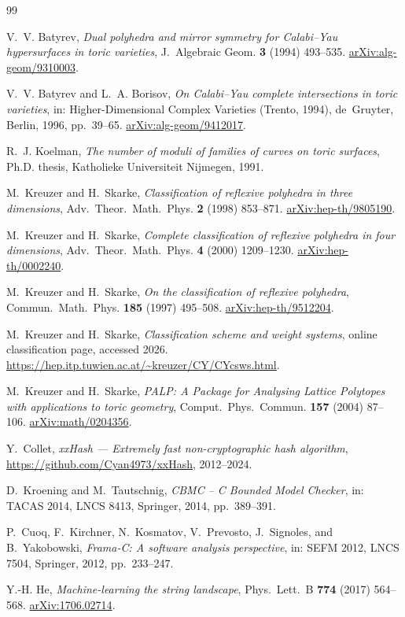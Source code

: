\documentclass[12pt,a4paper]{article}
\theoremstyle{definition}
\begin{document}

\begin{thebibliography}{99}

V.~V. Batyrev,
\emph{Dual polyhedra and mirror symmetry for Calabi--Yau hypersurfaces
in toric varieties},
J.~Algebraic Geom. \textbf{3} (1994) 493--535.
\href{https://arxiv.org/abs/alg-geom/9310003}{arXiv:alg-geom/9310003}.

V.~V. Batyrev and L.~A. Borisov,
\emph{On Calabi--Yau complete intersections in toric varieties},
in: Higher-Dimensional Complex Varieties (Trento, 1994), de~Gruyter,
Berlin, 1996, pp.~39--65.
\href{https://arxiv.org/abs/alg-geom/9412017}{arXiv:alg-geom/9412017}.

R.~J. Koelman,
\emph{The number of moduli of families of curves on toric surfaces},
Ph.D. thesis, Katholieke Universiteit Nijmegen, 1991.

M.~Kreuzer and H.~Skarke,
\emph{Classification of reflexive polyhedra in three dimensions},
Adv.~Theor.~Math.~Phys. \textbf{2} (1998) 853--871.
\href{https://arxiv.org/abs/hep-th/9805190}{arXiv:hep-th/9805190}.

M.~Kreuzer and H.~Skarke,
\emph{Complete classification of reflexive polyhedra in four dimensions},
Adv.~Theor.~Math.~Phys. \textbf{4} (2000) 1209--1230.
\href{https://arxiv.org/abs/hep-th/0002240}{arXiv:hep-th/0002240}.

M.~Kreuzer and H.~Skarke,
\emph{On the classification of reflexive polyhedra},
Commun.~Math.~Phys. \textbf{185} (1997) 495--508.
\href{https://arxiv.org/abs/hep-th/9512204}{arXiv:hep-th/9512204}.

M.~Kreuzer and H.~Skarke,
\emph{Classification scheme and weight systems},
online classification page, accessed 2026.
\url{https://hep.itp.tuwien.ac.at/~kreuzer/CY/CYcsws.html}.

M.~Kreuzer and H.~Skarke,
\emph{PALP: A Package for Analysing Lattice Polytopes with applications
to toric geometry},
Comput.~Phys.~Commun. \textbf{157} (2004) 87--106.
\href{https://arxiv.org/abs/math/0204356}{arXiv:math/0204356}.

Y.~Collet,
\emph{xxHash — Extremely fast non-cryptographic hash algorithm},
\url{https://github.com/Cyan4973/xxHash}, 2012--2024.

D.~Kroening and M.~Tautschnig,
\emph{CBMC -- C Bounded Model Checker},
in: TACAS 2014, LNCS 8413, Springer, 2014, pp.~389--391.

P.~Cuoq, F.~Kirchner, N.~Kosmatov, V.~Prevosto, J.~Signoles, and
B.~Yakobowski,
\emph{Frama-C: A software analysis perspective},
in: SEFM 2012, LNCS 7504, Springer, 2012, pp.~233--247.

Y.-H. He,
\emph{Machine-learning the string landscape},
Phys.~Lett.~B \textbf{774} (2017) 564--568.
\href{https://arxiv.org/abs/1706.02714}{arXiv:1706.02714}.

\end{thebibliography}
\end{document}
